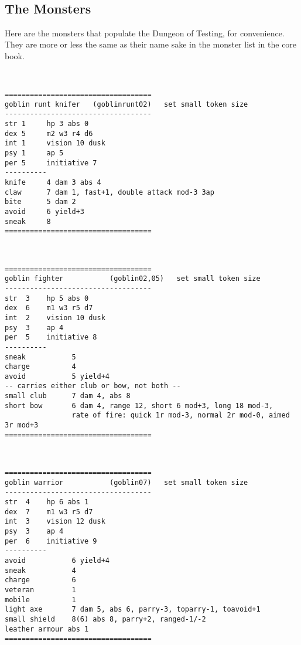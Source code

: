 \





\vfill

\raggedbottom


\subsection*{The Monsters}

Here are the monsters that populate the Dungeon of Testing, for convenience. They are more or less the same as their name sake in the monster list in the core book.

\

\goodbreak \begin{samepage} \small \begin{verbatim}
===================================
goblin runt knifer   (goblinrunt02)   set small token size
-----------------------------------
str 1     hp 3 abs 0
dex 5     m2 w3 r4 d6
int 1     vision 10 dusk
psy 1     ap 5
per 5     initiative 7
----------
knife     4 dam 3 abs 4
claw      7 dam 1, fast+1, double attack mod-3 3ap
bite      5 dam 2
avoid     6 yield+3
sneak     8
===================================
\end{verbatim} \normalsize \end{samepage}

\

\goodbreak \begin{samepage} \small \begin{verbatim}
===================================
goblin fighter           (goblin02,05)   set small token size
-----------------------------------
str  3    hp 5 abs 0
dex  6    m1 w3 r5 d7
int  2    vision 10 dusk
psy  3    ap 4
per  5    initiative 8
----------
sneak           5
charge          4
avoid           5 yield+4
-- carries either club or bow, not both --
small club      7 dam 4, abs 8
short bow       6 dam 4, range 12, short 6 mod+3, long 18 mod-3,
                rate of fire: quick 1r mod-3, normal 2r mod-0, aimed 3r mod+3
===================================
\end{verbatim} \normalsize \end{samepage}

\

\goodbreak \begin{samepage} \small \begin{verbatim}
===================================
goblin warrior           (goblin07)   set small token size
-----------------------------------
str  4    hp 6 abs 1
dex  7    m1 w3 r5 d7
int  3    vision 12 dusk
psy  3    ap 4
per  6    initiative 9
----------
avoid           6 yield+4
sneak           4
charge          6
veteran         1
mobile          1
light axe       7 dam 5, abs 6, parry-3, toparry-1, toavoid+1
small shield    8(6) abs 8, parry+2, ranged-1/-2
leather armour abs 1
===================================
\end{verbatim} \normalsize \end{samepage}

